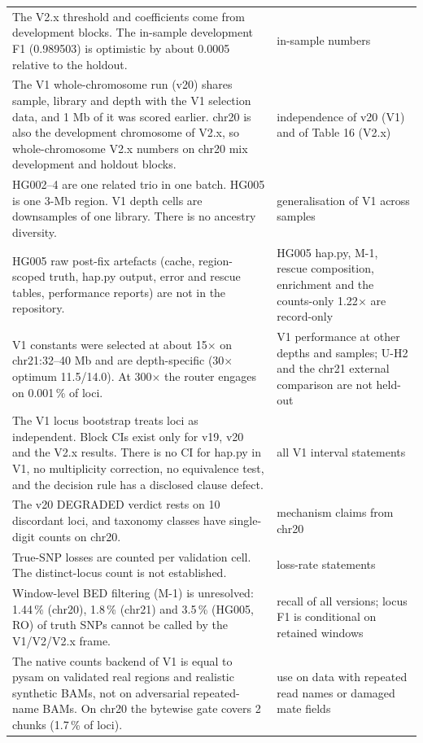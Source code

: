 \documentclass[11pt,a4paper]{article}
\begin{document}
{\begin{xltabular}{\linewidth}{>{\hsize\raggedright\arraybackslash}X>{\hsize\raggedright\arraybackslash}X}
The V2.x threshold and coefficients come from development blocks. The in-sample development F1 (0.989503) is optimistic by about 0.0005 relative to the holdout. & in-sample numbers \\
The V1 whole-chromosome run (v20) shares sample, library and depth with the V1 selection data, and 1 Mb of it was scored earlier. chr20 is also the development chromosome of V2.x, so whole-chromosome V2.x numbers on chr20 mix development and holdout blocks. & independence of v20 (V1) and of Table 16 (V2.x) \\
HG002--4 are one related trio in one batch. HG005 is one 3-Mb region. V1 depth cells are downsamples of one library. There is no ancestry diversity. & generalisation of V1 across samples \\
HG005 raw post-fix artefacts (cache, region-scoped truth, hap.py output, error and rescue tables, performance reports) are not in the repository. & HG005 hap.py, M-1, rescue composition, enrichment and the counts-only 1.22$\times$ are record-only \\
V1 constants were selected at about 15$\times$ on chr21:32--40 Mb and are depth-specific (30$\times$ optimum 11.5/14.0). At 300$\times$ the router engages on 0.001\,\% of loci. & V1 performance at other depths and samples; U-H2 and the chr21 external comparison are not held-out \\
The V1 locus bootstrap treats loci as independent. Block CIs exist only for v19, v20 and the V2.x results. There is no CI for hap.py in V1, no multiplicity correction, no equivalence test, and the decision rule has a disclosed clause defect. & all V1 interval statements \\
The v20 DEGRADED verdict rests on 10 discordant loci, and taxonomy classes have single-digit counts on chr20. & mechanism claims from chr20 \\
True-SNP losses are counted per validation cell. The distinct-locus count is not established. & loss-rate statements \\
Window-level BED filtering (M-1) is unresolved: 1.44\,\% (chr20), 1.8\,\% (chr21) and 3.5\,\% (HG005, RO) of truth SNPs cannot be called by the V1/V2/V2.x frame. & recall of all versions; locus F1 is conditional on retained windows \\
The native counts backend of V1 is equal to pysam on validated real regions and realistic synthetic BAMs, not on adversarial repeated-name BAMs. On chr20 the bytewise gate covers 2 chunks (1.7\,\% of loci). & use on data with repeated read names or damaged mate fields \\

\end{xltabular}}
\end{document}

